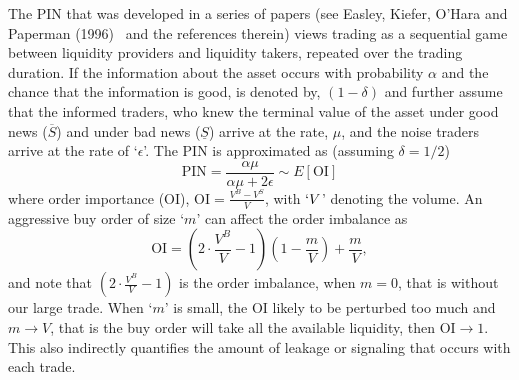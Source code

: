 The PIN that was developed in a series of papers (see Easley, Kiefer, O'Hara and Paperman (1996)~\cite{paper} and the references therein) views trading as a sequential game between liquidity providers and liquidity takers, repeated over the trading duration. If the information about the asset occurs with probability $\alpha$ and the chance that the information is good, is denoted by, $(1-\delta)$ and further assume that the informed traders, who knew the terminal value of the asset under good news ($\overline{S}$) and under bad news ($\underline{S}$) arrive at the rate, $\mu$, and the noise traders arrive at the rate of `$\epsilon$'. The PIN is approximated as (assuming $\delta=1/2$)
	\begin{equation}\label{eqn:pin}
	\text{PIN}=\dfrac{\alpha\mu}{\alpha\mu+2\epsilon} \sim E[\text{OI}]
	\end{equation}
where order importance (OI), $\text{OI}=\frac{V^B-V^S}{V}$, with $`V$' denoting the volume. An aggressive buy order of size `$m$' can affect the order imbalance as
	\begin{equation}\label{eqn:oi}
	\text{OI}=\left(2 \cdot \dfrac{V^B}{V}-1\right)\left(1-\dfrac{m}{V}\right) + \dfrac{m}{V},
	\end{equation}
and note that $\left(2\cdot \frac{V^B}{V}-1\right)$ is the order imbalance, when $m=0$, that is without our large trade. When `$m$' is small, the OI likely to be perturbed too much and $m \to V$, that is the buy order will take all the available liquidity, then OI$\to1$. This also indirectly quantifies the amount of leakage or signaling that occurs with each trade.


